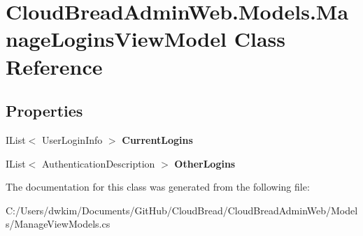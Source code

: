 \hypertarget{a00134}{}\section{Cloud\+Bread\+Admin\+Web.\+Models.\+Manage\+Logins\+View\+Model Class Reference}
\label{a00134}
\subsection*{Properties}
\begin{DoxyCompactItemize}
\item 
I\+List$<$ User\+Login\+Info $>$ {\bfseries Current\+Logins}\hypertarget{a00134_a66ba9b168052c4163035017accd9a96d}{}\label{a00134_a66ba9b168052c4163035017accd9a96d}

\item 
I\+List$<$ Authentication\+Description $>$ {\bfseries Other\+Logins}\hypertarget{a00134_aadd7584861ab087e1f065f85b6c71de3}{}\label{a00134_aadd7584861ab087e1f065f85b6c71de3}

\end{DoxyCompactItemize}


The documentation for this class was generated from the following file\+:\begin{DoxyCompactItemize}
\item 
C\+:/\+Users/dwkim/\+Documents/\+Git\+Hub/\+Cloud\+Bread/\+Cloud\+Bread\+Admin\+Web/\+Models/Manage\+View\+Models.\+cs\end{DoxyCompactItemize}
